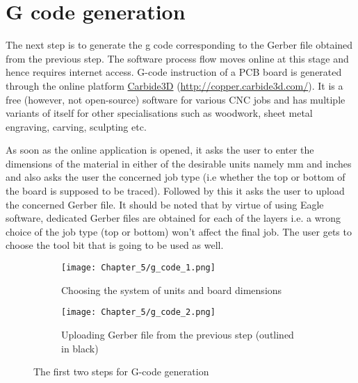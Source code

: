 \section{G code generation} \label{gcodegen}

The next step is to generate the g code corresponding to the Gerber file obtained from the previous step. The software process flow moves online at this stage and hence requires internet access. G-code instruction of a PCB board is generated through the online platform \href{http://copper.carbide3d.com/}{Carbide3D} (\url{http://copper.carbide3d.com/}). It is a free (however, not open-source) software for various CNC jobs and has multiple variants of itself for other specialisations such as woodwork, sheet metal engraving, carving, sculpting etc. \par

As soon as the online application is opened, it asks the user to enter the dimensions of the material in either of the desirable units namely mm and inches and also asks the user the concerned job type (i.e whether the top or bottom of the board is supposed to be traced). Followed by this it asks the user to upload the concerned Gerber file. It should be noted that by virtue of using Eagle software, dedicated Gerber files are obtained for each of the layers i.e. a wrong choice of the job type (top or bottom) won’t affect the final job. The user gets to choose the tool bit that is going to be used as well. \par

\begin{figure}[h]
 \begin{subfigure}{0.5\textwidth}
  \texttt{[image: Chapter\_5/g\_code\_1.png]}
  \caption{Choosing the system of units and board dimensions}
  \label{fig:g1}
 \end{subfigure}
 \begin{subfigure}{0.5\textwidth}
  \texttt{[image: Chapter\_5/g\_code\_2.png]}
  \caption{Uploading Gerber file from the previous step (outlined in black)}
  \label{fig:g2}
 \end{subfigure}
 \caption{The first two steps for G-code generation}
 \label{fig:g12}
\end{figure}

